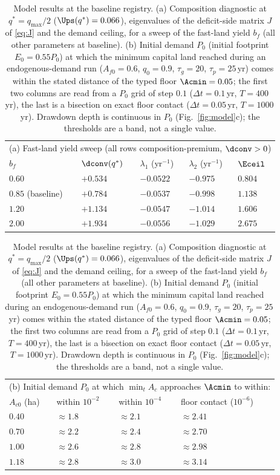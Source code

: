 \begin{table}[!htbp]
\centering\small
\caption{Model results at the baseline registry. (a) Composition diagnostic at $q^*=q_{\max}/2$ ($\Ups(q^*)=0.066$), eigenvalues of the deficit-side matrix $J$ of \eqref{eq:J} and the demand ceiling, for a sweep of the fast-land yield $b_f$ (all other parameters at baseline). (b) Initial demand $P_0$ (initial footprint $E_0=0.55P_0$) at which the minimum capital land reached during an endogenous-demand run ($A_{f0}=0.6$, $q_0=0.9$, $\tau_g=20$, $\tau_p=25$\,yr) comes within the stated distance of the typed floor $\Acmin=0.05$; the first two columns are read from a $P_0$ grid of step $0.1$ ($\Delta t=0.1$\,yr, $T=400$\,yr), the last is a bisection on exact floor contact ($\Delta t=0.05$\,yr, $T=1000$\,yr). Drawdown depth is continuous in $P_0$ (Fig.~\ref{fig:model}c); the thresholds are a band, not a single value.}
\label{tab:model}
\begin{tabular}{l l l l l}
\toprule
\multicolumn{5}{l}{(a) Fast-land yield sweep (all rows composition-premium, $\dconv>0$)}\\
$b_f$ & $\dconv(q^*)$ & $\lambda_1$ (yr$^{-1}$) & $\lambda_2$ (yr$^{-1}$) & $\Eceil$ \\
\midrule
$0.60$ & $+0.534$ & $-0.0522$ & $-0.975$ & $0.804$ \\
$0.85$ (baseline) & $+0.784$ & $-0.0537$ & $-0.998$ & $1.138$ \\
$1.20$ & $+1.134$ & $-0.0547$ & $-1.014$ & $1.606$ \\
$2.00$ & $+1.934$ & $-0.0556$ & $-1.029$ & $2.675$ \\
\bottomrule
\end{tabular}

\medskip
\begin{tabular}{l l l l}
\toprule
\multicolumn{4}{l}{(b) Initial demand $P_0$ at which $\min_tA_c$ approaches $\Acmin$ to within:}\\
$A_{c0}$ (ha) & within $10^{-2}$ & within $10^{-4}$ & floor contact ($10^{-6}$) \\
\midrule
$0.40$ & $\approx1.8$ & $\approx2.1$ & $\approx2.41$ \\
$0.70$ & $\approx2.2$ & $\approx2.4$ & $\approx2.70$ \\
$1.00$ & $\approx2.6$ & $\approx2.8$ & $\approx2.98$ \\
$1.18$ & $\approx2.8$ & $\approx3.0$ & $\approx3.14$ \\
\bottomrule
\end{tabular}
\end{table}

